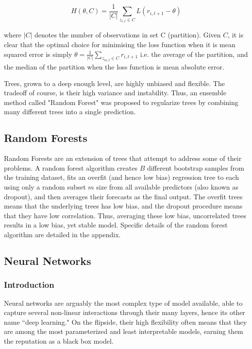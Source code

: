 \documentclass[a4paper]{article}
\begin{document}
	\begin{equation}
	H(\theta, C) = \frac{1}{|C|} \sum_{z_{i,t} \in C} L(r_{i,t+1} - \theta)
	\end{equation}
	
	where $|C|$ denotes the number of observations in set C (partition). Given $C$, it is clear that the optimal choice for minimising the loss function when it is mean squared error is simply $\theta = \frac{1}{|C|} \sum_{z_{io,t}\in C}^{ }r_{i,t+1}$ i.e. the average of the partition, and the median of the partition when the loss function is mean absolute error.
	
	Trees, grown to a deep enough level, are highly unbiased and flexible. The tradeoff of course, is their high variance and instability. Thus, an ensemble method called "Random Forest" was proposed to regularize trees by combining many different trees into a single prediction.
	
	\subsection{Random Forests}
	Random Forests are an extension of trees that attempt to address some of their problems. A random forest algorithm creates $B$ different bootstrap samples from the training dataset, fits an overfit (and hence low bias) regression tree to each using only a random subset $m$ size from all available predictors (also known as dropout), and then averages their forecasts as the final output. The overfit trees means that the underlying trees has low bias, and the dropout procedure means that they have low correlation. Thus, averaging these low bias, uncorrelated trees results in a low bias, yet stable model. Specific details of the random forest algorithm are detailed in the appendix.
	
	\pagebreak
	
	\subsection{Neural Networks}
	
	\subsubsection{Introduction}
	
	Neural networks are arguably the most complex type of model available, able to capture several non-linear interactions through their many layers, hence its other name ``deep learning." On the flipside, their high flexibility often means that they are among the most parameterized and least interpretable models, earning them the reputation as a black box model.
	
\end{document}
